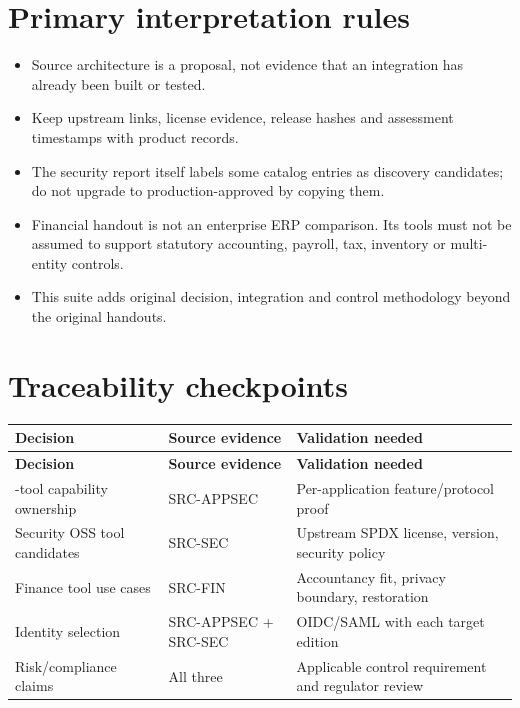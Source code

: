 \documentclass[10pt,letterpaper]{article}
\begin{document}
\section{Primary interpretation rules}
\begin{itemize}
\item Source architecture is a proposal, not evidence that an integration has already been built or tested.
\item Keep upstream links, license evidence, release hashes and assessment timestamps with product records.
\item The security report itself labels some catalog entries as discovery candidates; do not upgrade to production-approved by copying them.
\item Financial handout is not an enterprise ERP comparison. Its tools must not be assumed to support statutory accounting, payroll, tax, inventory or multi-entity controls.
\item This suite adds original decision, integration and control methodology beyond the original handouts.
\end{itemize}
\section{Traceability checkpoints}
\small\begin{longtable}{>{\raggedright\arraybackslash}p{}>{\raggedright\arraybackslash}p{}>{\raggedright\arraybackslash}p{}}
\toprule
\textbf{Decision} & \textbf{Source evidence} & \textbf{Validation needed}\\
\midrule\endfirsthead
\toprule
\textbf{Decision} & \textbf{Source evidence} & \textbf{Validation needed}\\
\midrule\endhead
11-tool capability ownership & SRC-APPSEC & Per-application feature/protocol proof\\
Security OSS tool candidates & SRC-SEC & Upstream SPDX license, version, security policy\\
Finance tool use cases & SRC-FIN & Accountancy fit, privacy boundary, restoration\\
Identity selection & SRC-APPSEC + SRC-SEC & OIDC/SAML with each target edition\\
Risk/compliance claims & All three & Applicable control requirement and regulator review\\
\bottomrule
\end{longtable}
\normalsize
\end{document}
